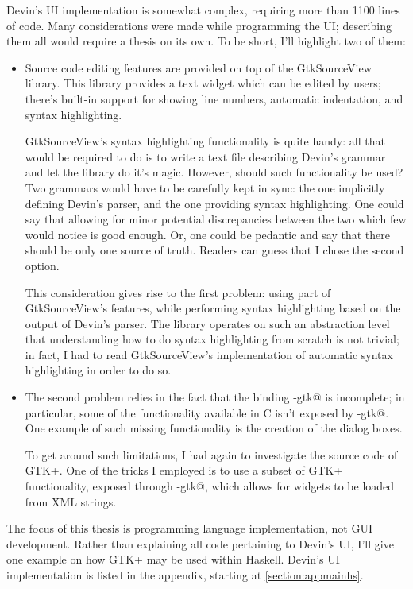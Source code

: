 \documentclass[UdineBachThesis,american,11pt]{PhdThesis}
\begin{document}
  Devin's UI implementation is somewhat complex, requiring more than 1100 lines
  of code. Many considerations were made while programming the UI; describing
  them all would require a thesis on its own. To be short, I'll highlight two
  of them:

  \begin{itemize}
    \item Source code editing features are provided on top of the GtkSourceView
    library. This library provides a text widget which can be edited by users;
    there's built-in support for showing line numbers, automatic indentation,
    and syntax highlighting.

    GtkSourceView's syntax highlighting functionality is quite handy: all that
    would be required to do is to write a text file describing Devin's grammar
    and let the library do it's magic. However, should such functionality be
    used? Two grammars would have to be carefully kept in sync: the one
    implicitly defining Devin's parser, and the one providing syntax
    highlighting. One could say that allowing for minor potential discrepancies
    between the two which few would notice is good enough. Or, one could be
    pedantic and say that there should be only one source of truth. Readers can
    guess that I chose the second option.

    This consideration gives rise to the first problem: using part of
    GtkSourceView's features, while performing syntax highlighting based on the
    output of Devin's parser. The library operates on such an abstraction level
    that understanding how to do syntax highlighting from scratch is not
    trivial; in fact, I had to read GtkSourceView's implementation of automatic
    syntax highlighting in order to do so.

    \item The second problem relies in the fact that the binding
    \lstinline@gi-gtk@ is incomplete; in particular, some of the functionality
    available in C isn't exposed by \lstinline@gi-gtk@. One example of such
    missing functionality is the creation of the dialog boxes.

    To get around such limitations, I had again to investigate the source code
    of GTK+. One of the tricks I employed is to use a subset of GTK+
    functionality, exposed through \lstinline@gi-gtk@, which allows for widgets
    to be loaded from XML strings.
  \end{itemize}

  The focus of this thesis is programming language implementation, not GUI
  development. Rather than explaining all code pertaining to Devin's UI, I'll
  give one example on how GTK+ may be used within Haskell. Devin's UI
  implementation is listed in the appendix, starting at
  \autoref{section:appmainhs}.
\end{document}
